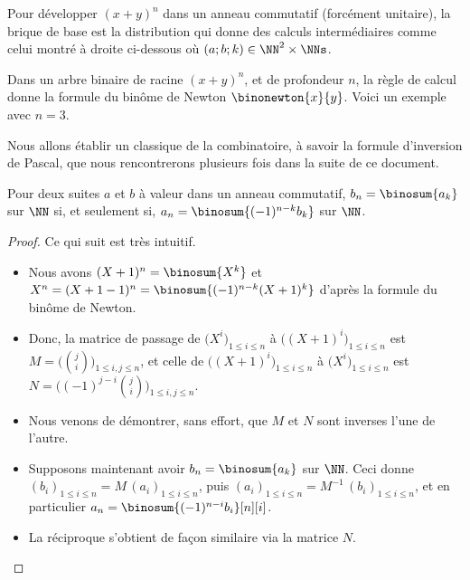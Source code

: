 Pour développer $(x + y)^n$ dans un anneau commutatif (forcément unitaire), la brique de base est la distribution qui donne des calculs intermédiaires comme celui montré à droite ci-dessous où $(a;b;k) \in \NN^2 \times \NNs$.

%
            {\intertree}{}

Dans un arbre binaire de racine $(x + y)^n$, et de profondeur $n$, la règle de calcul donne la formule du binôme de Newton
$\binonewton{x}{y}$.
%
Voici un exemple avec $n=3$.





Nous allons établir un classique de la combinatoire, à savoir la formule d'inversion de Pascal, que nous rencontrerons plusieurs fois dans la suite de ce document.


\begin{fact} \label{pascal-inv}
    Pour deux suites $a$ et $b$ à valeur dans un anneau commutatif,
    $b_n = \binosum{a_k}$ sur $\NN$
    si, et seulement si,
    $a_n = \binosum{(-1)^{n-k} b_k}$ sur $\NN$.
\end{fact}


\begin{proof}
    Ce qui suit est très intuitif.
    \begin{itemize}
        \item Nous avons
        $(X + 1)^n = \binosum{X^k}$
        et
        $X^n = (X + 1 - 1)^n = \binosum{(-1)^{n-k} (X+1)^k}$
        d'après la formule du binôme de Newton.


        \item Donc, la matrice de passage de
        $\big( X^i \big)_{1 \leq i \leq n}$
        à
        $\big( (X + 1)^i \big)_{1 \leq i \leq n}$
        est
        $M = \big( \binom{j}{i} \big)_{1 \leq i, j \leq n}$,
        et celle de
        $\big( (X + 1)^i \big)_{1 \leq i \leq n}$
        à
        $\big( X^i \big)_{1 \leq i \leq n}$
        est
        $N = \big( (-1)^{j-i} \binom{j}{i} \big)_{1 \leq i, j \leq n}$.


        \item Nous venons de démontrer, sans effort, que $M$ et $N$ sont inverses l'une de l'autre.


        \item Supposons maintenant avoir $b_n = \binosum{a_k}$  sur $\NN$.
        Ceci donne
        $(b_i)_{1 \leq i \leq n} = M \, (a_i)_{1 \leq i \leq n}$,
        puis
        $(a_i)_{1 \leq i \leq n} = M^{-1} \, (b_i)_{1 \leq i \leq n}$,
        et en particulier
        $a_n = \binosum{(-1)^{n-i} b_i}[n][i]$.


        \item La réciproque s'obtient de façon similaire via la matrice $N$.
    \end{itemize}

    \null\vspace{-6ex}
\end{proof}


